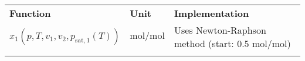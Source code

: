 %
\begin{longtable}[l]{l|l|p{7.5cm}}
	\toprule
	\addlinespace
	\textbf{Function} & \textbf{Unit} &	\textbf{Implementation} \\
	\addlinespace
	\midrule
	\endhead
	
	\bottomrule
	\endfoot
	\bottomrule
	\endlastfoot
	\addlinespace
	
	$x_1(p,T,v_1,v_2,p_\mathrm{sat,1}(T))$& $\si{\mole\per\mole}$ & Uses Newton-Raphson method (start: 0.5 $\si{\mole\per\mole}$) \\
	
	\addlinespace
\end{longtable}
%
